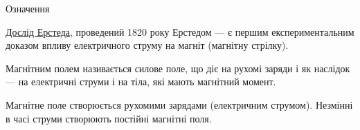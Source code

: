 \documentclass{beamer}
\begin{document}
\begin{frame}{Означення}{}
\begin{block}{}\justifying\small
    \href{https://www.youtube.com/watch?v=qS361iadCPA}{Дослід Ерстеда}, проведений 1820 року Ерстедом --- є першим експериментальним доказом впливу
    електричного струму на магніт (магнітну стрілку).
\end{block}
\begin{block}{}\justifying
		\alert{Магнітним полем} називається силове поле, що \alert{діє на рухомі заряди} і як наслідок --- на електричні струми  і на тіла, які мають
		магнітний  момент.
\end{block}
\begin{block}{}\justifying
		Магнітне поле створюється рухомими зарядами (електричним струмом). Незмінні в часі струми створюють постійні магнітні поля.
\end{block}
\begin{columns}
	\begin{column}{0.5\linewidth}\centering
{}
\end{column}
\end{columns}
\end{frame}
\end{document}

